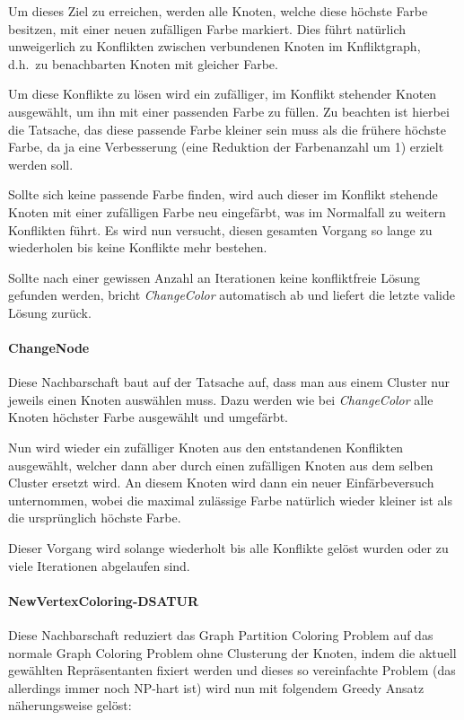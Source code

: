 \documentclass[paper=a4,fontsize=12pt]{scrartcl}
\begin{document}
Um dieses Ziel zu erreichen, werden alle Knoten, welche diese höchste Farbe besitzen, mit einer neuen zufälligen Farbe markiert. Dies führt natürlich unweigerlich zu Konflikten zwischen verbundenen Knoten im Knfliktgraph, d.h.\ zu benachbarten Knoten mit gleicher Farbe. 

Um diese Konflikte zu lösen wird ein zufälliger, im Konflikt stehender Knoten ausgewählt, um ihn mit einer passenden Farbe zu füllen. Zu beachten ist hierbei die Tatsache, das diese passende Farbe kleiner sein muss als die frühere höchste Farbe, da ja eine Verbesserung (eine Reduktion der Farbenanzahl um 1) erzielt werden soll.

Sollte sich keine passende Farbe finden, wird auch dieser im Konflikt stehende Knoten mit einer zufälligen Farbe neu eingefärbt, was im Normalfall zu weitern Konflikten führt. Es wird nun versucht, diesen gesamten Vorgang so lange zu wiederholen bis keine Konflikte mehr bestehen. 

Sollte nach einer gewissen Anzahl an Iterationen keine konfliktfreie Lösung gefunden werden, bricht \emph{ChangeColor} automatisch ab und liefert die letzte valide Lösung zurück.

\paragraph{ChangeNode}
Diese Nachbarschaft baut auf der Tatsache auf, dass man aus einem Cluster nur jeweils einen Knoten auswählen muss. Dazu werden wie bei \emph{ChangeColor} alle Knoten höchster Farbe ausgewählt und umgefärbt.

Nun wird wieder ein zufälliger Knoten aus den entstandenen Konflikten ausgewählt, welcher dann aber durch einen zufälligen Knoten aus dem selben Cluster ersetzt wird. An diesem Knoten wird dann ein neuer Einfärbeversuch unternommen, wobei die maximal zulässige Farbe natürlich wieder kleiner ist als die ursprünglich höchste Farbe.

Dieser Vorgang wird solange wiederholt bis alle Konflikte gelöst wurden oder zu viele Iterationen abgelaufen sind.

\paragraph{NewVertexColoring-DSATUR}
Diese Nachbarschaft reduziert das Graph Partition Coloring Problem auf das normale Graph Coloring Problem ohne Clusterung der Knoten, indem die aktuell gewählten Repräsentanten fixiert werden und dieses so vereinfachte Problem (das allerdings immer noch NP-hart ist) wird nun mit folgendem Greedy Ansatz näherungsweise gelöst:
\end{document}
